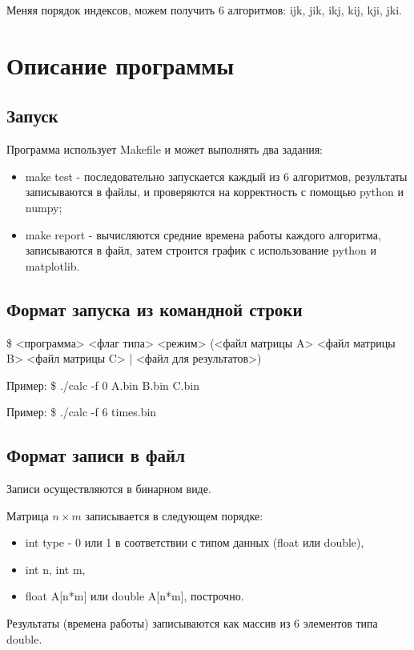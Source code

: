 \documentclass[14pt]{extarticle}
\begin{document}
Меняя порядок индексов, можем получить 6 алгоритмов: ijk, jik, ikj, kij, kji, jki.

\newpage

\section*{Описание программы}
\subsection*{Запуск}
Программа использует Makefile и может выполнять два задания:
\begin{itemize}
\item make test - последовательно запускается каждый из 6 алгоритмов, результаты записываются в файлы, и проверяются на корректность с помощью python и numpy;
\item make report - вычисляются средние времена работы каждого алгоритма, записываются в файл, затем строится график с использование python и matplotlib.
\end{itemize}

\subsection*{Формат запуска из командной строки}
\$ <программа> <флаг типа> <режим> (<файл матрицы A> <файл матрицы B> <файл матрицы C> | <файл для результатов>)

Пример: \$ ./calc -f 0 A.bin B.bin C.bin

Пример: \$ ./calc -f 6 times.bin

\subsection*{Формат записи в файл}
Записи осуществляются в бинарном виде.

Матрица $ n \times m $ записывается в следующем порядке:
\begin{itemize}
\item int type - 0 или 1 в соответствии с типом данных (float или double),
\item int n, int m,
\item float A[n*m] или double A[n*m], построчно.
\end{itemize}
Результаты (времена работы) записываются как массив из 6 элементов типа double.

\newpage
\end{document}
